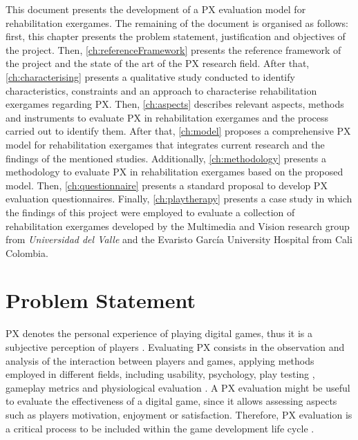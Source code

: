 This document presents the development of a \ac{PX} evaluation model for rehabilitation exergames. The remaining of the document is organised as follows: first, this chapter presents the problem statement, justification and objectives of the project. Then, \autoref{ch:referenceFramework} presents the reference framework of the project and the state of the art of the \ac{PX} research field. After that, \autoref{ch:characterising} presents a qualitative study conducted to identify characteristics, constraints and an approach to characterise rehabilitation exergames regarding \ac{PX}. Then, \autoref{ch:aspects} describes relevant aspects, methods and instruments to evaluate \ac{PX} in rehabilitation exergames and the process carried out to identify them. After that, \autoref{ch:model} proposes a comprehensive \ac{PX} model for rehabilitation exergames that integrates current research and the findings of the mentioned studies. Additionally, \autoref{ch:methodology} presents a methodology to evaluate \ac{PX} in rehabilitation exergames based on the proposed model. Then, \autoref{ch:questionnaire} presents a standard proposal to develop \ac{PX} evaluation questionnaires. Finally, \autoref{ch:playtherapy} presents a case study in which the findings of this project were employed to evaluate a collection of rehabilitation exergames developed by the Multimedia and Vision research group from \textit{Universidad del Valle} and the Evaristo Garc\'ia University Hospital from Cali Colombia.

\section{Problem Statement}


\ac{PX} denotes the personal experience of playing digital games, thus it is a subjective perception of players \autocite{Wiemeyer2016,Chu2011}. Evaluating \ac{PX} consists in the observation and analysis of the interaction between players and games, applying methods employed in different fields, including usability, psychology, play testing \autocite{Wiemeyer2016}, gameplay metrics \autocite{Drachen2013} and physiological evaluation \autocite{Nacke2015}. A \ac{PX} evaluation might be useful to evaluate the effectiveness of a digital game, since it allows assessing aspects such as players motivation, enjoyment or satisfaction. Therefore, \ac{PX} evaluation is a critical process to be included within the game development life cycle \autocite{Bernhaupt2015,McAllister2015,desurvire_methods_2013,Nacke2009}.

